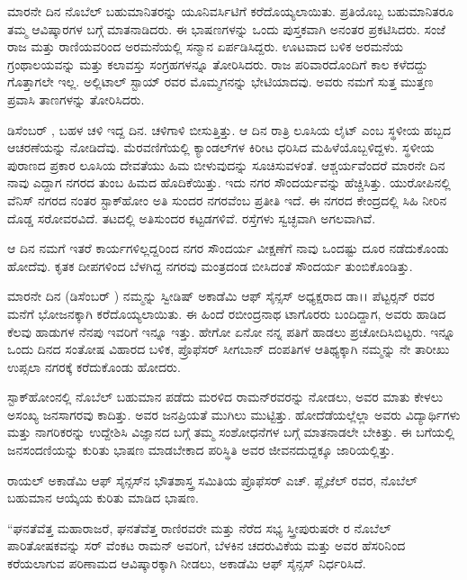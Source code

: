 ಮಾರನೇ ದಿನ ನೊಬೆಲ್ ಬಹುಮಾನಿತರನ್ನು ಯೂನಿವರ್ಸಿಟಿಗೆ ಕರೆದೊಯ್ಯಲಾಯಿತು. ಪ್ರತಿಯೊಬ್ಬ ಬಹುಮಾನಿತರೂ ತಮ್ಮ ಆವಿಷ್ಕಾರಗಳ ಬಗ್ಗೆ ಮಾತನಾಡಿದರು. ಈ ಭಾಷಣಗಳನ್ನು ಒಂದು ಪುಸ್ತಕವಾಗಿ ಅನಂತರ ಪ್ರಕಟಿಸಿದರು. ಸಂಜೆ ರಾಜ ಮತ್ತು ರಾಣಿಯವರಿಂದ ಅರಮನೆಯಲ್ಲಿ ಸನ್ಮಾನ ಏರ್ಪಡಿಸಿದ್ದರು. ಊಟವಾದ ಬಳಿಕ ಅರಮನೆಯ ಗ್ರಂಥಾಲಯವನ್ನು ಮತ್ತು ಕಲಾವಸ್ತು ಸಂಗ್ರಹಗಳನ್ನೂ ತೋರಿಸಿದರು. ರಾಜ ಪರಿವಾರದೊಂದಿಗೆ ಕಾಲ ಕಳೆದದ್ದು ಗೊತ್ತಾಗಲೇ ಇಲ್ಲ. ಅಲ್ಲಿ\break ಟಾಲ್ ಸ್ಟಾಯ್ ರವರ ಮೊಮ್ಮಗನನ್ನು ಭೇಟಿಯಾದವು. ಅವರು ನಮಗೆ ಸುತ್ತ ಮುತ್ತಣ ಪ್ರವಾಸಿ ತಾಣಗಳನ್ನು ತೋರಿಸಿದರು.

ಡಿಸೆಂಬರ್ , ಬಹಳ ಚಳಿ ಇದ್ದ ದಿನ. ಚಳಿಗಾಳಿ ಬೀಸುತ್ತಿತ್ತು. ಆ ದಿನ ರಾತ್ರಿ ಲೂಸಿಯ ಲೈಟ್ ಎಂಬ ಸ್ಥಳೀಯ ಹಬ್ಬದ ಆಚರಣೆಯನ್ನು ನೋಡಿದೆವು. ಮೆರವಣಿಗೆಯಲ್ಲಿ ಕ್ಯಾಂಡಲ್‍ಗಳ ಕಿರೀಟ ಧರಿಸಿದ ಮಹಿಳೆಯೊಬ್ಬಳಿದ್ದಳು. ಸ್ಥಳೀಯ ಪುರಾಣದ ಪ್ರಕಾರ ಲೂಸಿಯ ದೇವತೆಯು ಹಿಮ ಬೀಳುವುದನ್ನು ಸೂಚಿಸುವಳಂತೆ. ಆಶ್ಚರ್ಯವೆಂದರೆ ಮಾರನೇ ದಿನ ನಾವು ಎದ್ದಾಗ ನಗರದ ತುಂಬ ಹಿಮದ ಹೊದಿಕೆಯಿತ್ತು. ಇದು ನಗರ ಸೌಂದರ್ಯವನ್ನು ಹೆಚ್ಚಿಸಿತ್ತು. ಯುರೋಪಿನಲ್ಲಿ ವೆನಿಸ್ ನಗರದ ನಂತರ ಸ್ಟಾಕ್‍ಹೋಂ ಅತಿ ಸುಂದರ ನಗರವೆಂಬ ಪ್ರತೀತಿ ಇದೆ. ಈ ನಗರದ ಕೇಂದ್ರದಲ್ಲಿ ಸಿಹಿ ನೀರಿನ ದೊಡ್ಡ ಸರೋವರವಿದೆ. ತಟದಲ್ಲಿ ಅತಿಸುಂದರ ಕಟ್ಟಡಗಳಿವೆ. ರಸ್ತೆಗಳು ಸ್ವಚ್ಛವಾಗಿ ಅಗಲವಾಗಿವೆ.

ಆ ದಿನ ನಮಗೆ ಇತರೆ ಕಾರ್ಯಗಳಿಲ್ಲದ್ದರಿಂದ ನಗರ ಸೌಂದರ್ಯ ವೀಕ್ಷಣೆಗೆ ನಾವು ಒಂದಷ್ಟು ದೂರ ನಡೆದುಕೊಂಡು ಹೋದೆವು. ಕೃತಕ ದೀಪಗಳಿಂದ ಬೆಳಗಿದ್ದ ನಗರವು ಮಂತ್ರದಂಡ ಬೀಸಿದಂತೆ ಸೌಂದರ್ಯ ತುಂಬಿಕೊಂಡಿತ್ತು.

ಮಾರನೇ ದಿನ (ಡಿಸೆಂಬರ್ ) ನಮ್ಮನ್ನು ಸ್ವೀಡಿಷ್ ಅಕಾಡೆಮಿ ಆಫ್ ಸೈನ್ಸಸ್ ಅಧ್ಯಕ್ಷರಾದ ಡಾ।। ಪೆಟ್ಟರ್‍ಸನ್ ರವರ ಮನೆಗೆ ಭೋಜನಕ್ಕಾಗಿ ಕರೆದೊಯ್ಯಲಾಯಿತು. ಈ ಹಿಂದೆ ರಬೀಂದ್ರನಾಥ ಟಾಗೊರರು ಬಂದಿದ್ದಾಗ, ಅವರು ಹಾಡಿದ ಕೆಲವು ಹಾಡುಗಳ ನೆನಪು ಇವರಿಗೆ ಇನ್ನೂ ಇತ್ತು. ಹೇಗೋ ಏನೋ ನನ್ನ ಪತಿಗೆ ಹಾಡಲು ಪ್ರಚೋದಿಸಿಬಿಟ್ಟರು. ಇನ್ನೂ ಒಂದು ದಿನದ ಸಂತೋಷ ವಿಹಾರದ ಬಳಿಕ, ಪ್ರೊಫೆಸರ್ ಸೀಗಬಾನ್ ದಂಪತಿಗಳ ಆತಿಥ್ಯಕ್ಕಾಗಿ ನಮ್ಮನ್ನು ನೇ ತಾರೀಖು ಉಪ್ಸಲಾ ನಗರಕ್ಕೆ ಕರೆದುಕೊಂಡು ಹೋದರು.

ಸ್ಟಾಕ್‍ಹೋಂನಲ್ಲಿ ನೊಬೆಲ್ ಬಹುಮಾನ ಪಡೆದು ಮರಳಿದ ರಾಮನ್‍ರವರನ್ನು ನೋಡಲು, ಅವರ ಮಾತು ಕೇಳಲು ಅಸಂಖ್ಯ ಜನಸಾಗರವು ಕಾದಿತ್ತು. ಅವರ ಜನಪ್ರಿಯತೆ ಮುಗಿಲು ಮುಟ್ಟಿತ್ತು. ಹೋದೆಡೆಯಲ್ಲೆಲ್ಲಾ ಅವರು ವಿದ್ಯಾರ್ಥಿಗಳು ಮತ್ತು ನಾಗರಿಕರನ್ನು ಉದ್ದೇಶಿಸಿ ವಿಜ್ಞಾನದ ಬಗ್ಗೆ ತಮ್ಮ ಸಂಶೋಧನೆಗಳ ಬಗ್ಗೆ ಮಾತನಾಡಲೇ ಬೇಕಿತ್ತು. ಈ ಬಗೆಯಲ್ಲಿ ಜನಸಂದಣಿಯನ್ನು ಕುರಿತು ಭಾಷಣ ಮಾಡಬೇಕಾದ ಪರಿಸ್ಥಿತಿ ಅವರ ಜೀವನದುದ್ದಕ್ಕೂ ಜಾರಿಯಲ್ಲಿತ್ತು.

ರಾಯಲ್ ಅಕಾಡೆಮಿ ಆಫ್ ಸೈನ್ಸಸ್‍ನ ಭೌತಶಾಸ್ತ್ರ ಸಮಿತಿಯ ಪ್ರೊಫೆಸರ್ ಎಚ್. ಪ್ಲೈಜೆಲ್ ರವರ, ನೊಬೆಲ್ ಬಹುಮಾನ ಆಯ್ಕೆಯ ಕುರಿತು ಮಾಡಿದ ಭಾಷಣ.

“ಘನತೆವೆತ್ತ ಮಹಾರಾಜರೆ, ಘನತೆವೆತ್ತ ರಾಣಿರವರೇ ಮತ್ತು ನೆರೆದ ಸಭ್ಯ ಸ್ತ್ರೀ\enginline{-}ಪುರುಷರೇ  ರ ನೊಬೆಲ್ ಪಾರಿತೋಷಕವನ್ನು ಸರ್ ವೆಂಕಟ ರಾಮನ್ ಅವರಿಗೆ, ಬೆಳಕಿನ ಚದರುವಿಕೆಯ ಮತ್ತು ಅವರ ಹೆಸರಿನಿಂದ ಕರೆಯಲಾಗುವ ಪರಿಣಾಮದ ಆವಿಷ್ಕಾರಕ್ಕಾಗಿ ನೀಡಲು, ಅಕಾಡೆಮಿ ಆಫ್ ಸೈನ್ಸಸ್ ನಿರ್ಧರಿಸಿದೆ.

